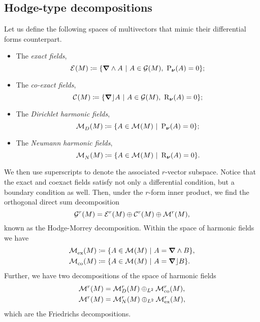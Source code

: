 \subsection{Hodge-type decompositions}
Let us define the following spaces of multivectors that mimic their differential forms counterpart.
\begin{itemize}
    \item The \emph{exact fields},
    \begin{equation}
        \mathcal{E}^{}(M)\coloneqq \{\boldsymbol{\nabla} \wedge A ~\vert~ A \in \mathcal{G}(M), ~ \operatorname{P}_{\boldsymbol{\nu}}(A) = 0\};
    \end{equation}
    \item The \emph{co-exact fields},
    \begin{equation}
        \mathcal{C}^{}(M)\coloneqq \{\boldsymbol{\nabla} \rfloor A ~\vert~ A \in \mathcal{G}(M), ~ \operatorname{R}_{\boldsymbol{\nu}}(A) = 0\};
    \end{equation}
    \item The \emph{Dirichlet harmonic fields},
    \begin{equation}
        \mathcal{M}^{}_D(M)\coloneqq \{A \in \mathcal{M}^{}(M) ~\vert~ \operatorname{P}_{\boldsymbol{\nu}}(A) = 0\};
    \end{equation}
    \item The \emph{Neumann harmonic fields},
    \begin{equation}
        \mathcal{M}^{}_N(M)\coloneqq \{A \in \mathcal{M}^{}(M) ~\vert~ \operatorname{R}_{\boldsymbol{\nu}}(A) = 0\}.
    \end{equation}
\end{itemize}
We then use superscripts to denote the associated $r$-vector subspace. Notice that the exact and coexact fields satisfy not only a differential condition, but a boundary condition as well. Then, under the $r$-form inner product, we find the orthogonal direct sum decomposition
\begin{equation}
\mathcal{G}^r(M) = \mathcal{E}^{r}(M) \oplus \mathcal{C}^{r}(M) \oplus \mathcal{M}^{r}(M),
\end{equation}
known as the Hodge-Morrey decomposition. Within the space of harmonic fields we have
\begin{align}
    \mathcal{M}^{}_{\textrm{ex}}(M) &\coloneqq \{A \in \mathcal{M}^{}(M) ~\vert~ A = \boldsymbol{\nabla} \wedge B \},\\
    \mathcal{M}^{}_{\textrm{co}}(M) &\coloneqq \{A \in \mathcal{M}^{}(M) ~\vert~ A = \boldsymbol{\nabla} \rfloor B \}.
\end{align}
Further, we have two decompositions of the space of harmonic fields 
\begin{align}
    \mathcal{M}^{r}(M) &= \mathcal{M}^{r}_D(M) \oplus_{L^2} \mathcal{M}^{r}_{\textrm{co}}(M), \\
    \mathcal{M}^{r}(M) &= \mathcal{M}^{r}_N(M) \oplus_{L^2} \mathcal{M}^{r}_{\textrm{ex}}(M),
\end{align}
which are the Friedrichs decompositions.


